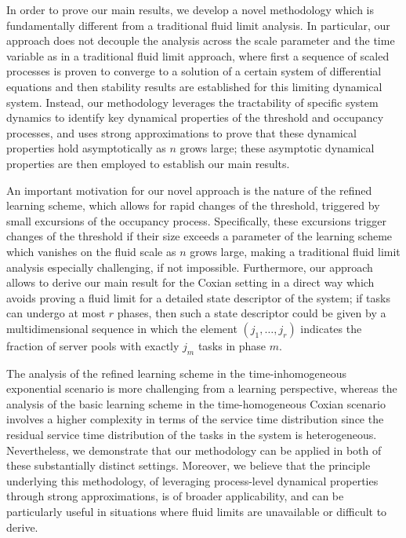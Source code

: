 \documentclass[a4paper, 12pt]{article}
\theoremstyle{definition}
\begin{document}
In order to prove our main results, we develop a novel methodology which is fundamentally different from a traditional fluid limit analysis. In particular, our approach does not decouple the analysis across the scale parameter and the time variable as in a traditional fluid limit approach, where first a sequence of scaled processes is proven to converge to a solution of a certain system of differential equations and then stability results are established for this limiting dynamical system. Instead, our methodology leverages the tractability of specific system dynamics to identify key dynamical properties of the threshold and occupancy processes, and uses strong approximations to prove that these dynamical properties hold asymptotically as $n$ grows large; these asymptotic dynamical properties are then employed to establish our main results.

An important motivation for our novel approach is the nature of the refined learning scheme, which allows for rapid changes of the threshold, triggered by small excursions of the occupancy process. Specifically, these excursions trigger changes of the threshold if their size exceeds a parameter of the learning scheme which vanishes on the fluid scale as $n$ grows large, making a traditional fluid limit analysis especially challenging, if not impossible. Furthermore, our approach allows to derive our main result for the Coxian setting in a direct way which avoids proving a fluid limit for a detailed state descriptor of the system; if tasks can undergo at most $r$ phases, then such a state descriptor could be given by a multidimensional sequence in which the element $(j_1, \dots, j_r)$ indicates the fraction of server pools with exactly $j_m$ tasks in phase $m$.

The analysis of the refined learning scheme in the time-inhomogeneous exponential scenario is more challenging from a learning perspective, whereas the analysis of the basic learning scheme in the time-homogeneous Coxian scenario involves a higher complexity in terms of the service time distribution since the residual service time distribution of the tasks in the system is heterogeneous. Nevertheless, we demonstrate that our methodology can be applied in both of these substantially distinct settings. Moreover, we believe that the principle underlying this methodology, of leveraging process-level dynamical properties through strong approximations, is of broader applicability, and can be particularly useful in situations where fluid limits are unavailable or difficult to derive.
\end{document}
